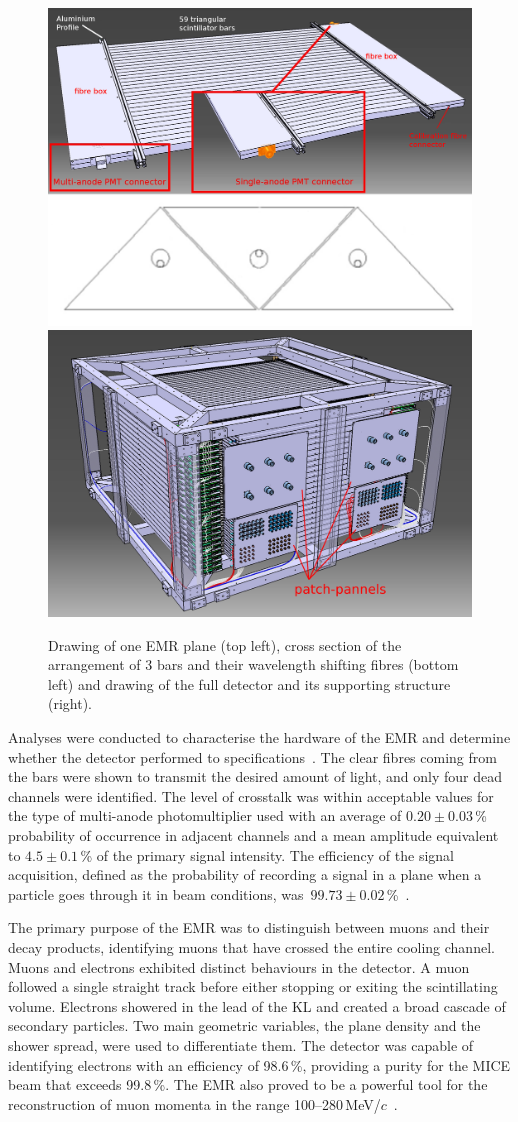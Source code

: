 \begin{figure}[htb!]
	\begin{center}
		\includegraphics[width=0.465\columnwidth]{EMR1.png}
		\hfill
		\includegraphics[width=0.515\columnwidth]{EMR2.jpg}
		\caption{Drawing of one EMR plane (top left), cross section of the arrangement of 3 bars and their wavelength shifting fibres (bottom left) and drawing of the full detector and its supporting structure (right).}
		\label{fig:EMR}
	\end{center}
\end{figure}

Analyses were conducted to characterise the hardware of the EMR and determine whether the detector performed to specifications~\cite{Drielsma:2017doj}. The clear fibres coming from the bars were shown to transmit the desired amount of light, and only four dead channels were identified. The level of crosstalk was within acceptable values for the type of multi-anode photomultiplier used with an average of $0.20\pm0.03$\,\% probability of occurrence in adjacent channels and a mean amplitude equivalent to $4.5\pm0.1$\,\% of the primary signal intensity. The efficiency of the signal acquisition, defined as the probability of recording a signal in a plane when a particle goes through it in beam conditions, was~$99.73\pm0.02$\,\%~\cite{2016JInst..11T10007}.

The primary purpose of the EMR was to distinguish between muons and their decay products, identifying muons that have crossed the entire cooling channel. Muons and electrons exhibited distinct behaviours in the detector. A muon followed a single straight track before either stopping or exiting the scintillating volume. Electrons showered in the lead of the KL and created a broad cascade of secondary particles. Two main geometric variables, the plane density and the shower spread, were used to differentiate them. The detector was capable of identifying electrons with an efficiency of 98.6\,\%, providing a purity for the MICE beam that exceeds 99.8\,\%. The EMR also proved to be a powerful tool for the reconstruction of muon momenta in the range 100--280\,MeV/$c$~\cite{2015JInst..10P2012A}.

